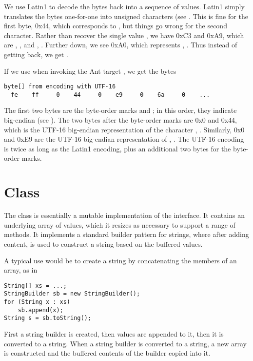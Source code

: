 We use Latin1 to decode the bytes back into a sequence of 
values.  Latin1 simply translates the bytes one-for-one into unsigned
characters (see .  This is fine for the first byte,
0x44, which corresponds to , but things go wrong for the
second character.  Rather than recover the single  value
, we have 0xC3 and 0xA9, which are ,
, and , 
.  Further down, we see 0xA0, which
represents , .  Thus instead
of getting  back, we get 
.  

If we use  when invoking the Ant target
, we get the bytes
%
\begin{verbatim}
byte[] from encoding with UTF-16
  fe    ff     0    44     0    e9     0    6a     0    ...
\end{verbatim}
%
The first two bytes are the byte-order marks  and
; in this order, they indicate big-endian 
(see ).  The two bytes after the byte-order
marks are 0x0 and 0x44, which is the UTF-16 big-endian representation
of the character , .
Similarly, 0x0 and 0xE9 are the UTF-16 big-endian representation of
, .  The
UTF-16 encoding is twice as long as the Latin1 encoding, plus an
additional two bytes for the byte-order marks.


\section{ Class}

The  class is essentially a mutable implementation
of the  interface.  It contains an underlying array
of  values, which it resizes as necessary to support a
range of  methods.  It implements a standard
builder pattern for strings, where after adding content, 
is used to construct a string based on the buffered values.

A typical use would be to create a string by concatenating the members
of an array, as in
%
\begin{verbatim}
String[] xs = ...;
StringBuilder sb = new StringBuilder();
for (String x : xs)
    sb.append(x);
String s = sb.toString();
\end{verbatim}
%
First a string builder is created, then values are appended to it,
then it is converted to a string.  When a string builder is converted
to a string, a new array is constructed and the buffered contents of
the builder copied into it.

